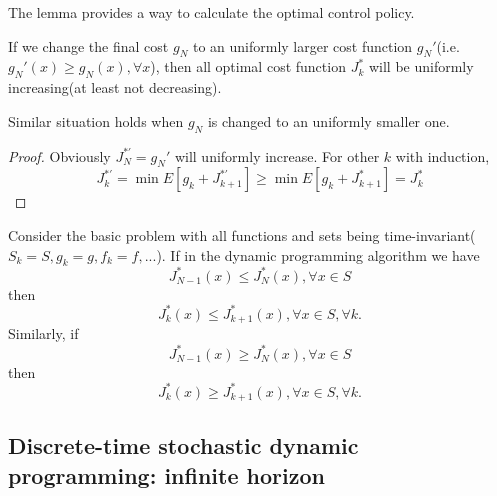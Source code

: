 \begin{refsection}
\begin{remark}[interpretation]
	The lemma provides a way to calculate the optimal control policy.
\end{remark}

\begin{lemma}
	If we change the final cost $g_N$ to an uniformly larger cost function $g_N'$(i.e. $g_N'(x) \geq g_N(x),\forall x$), then all optimal cost function $J_k^*$ will be uniformly increasing(at least not decreasing).
	
	Similar situation holds when $g_N$ is changed to an uniformly smaller one.
\end{lemma}
\begin{proof}
	Obviously $J_N^{*'} = g_N'$ will uniformly increase. For other $k$ with induction, 
	$$J_k^{*'} = \min E[g_k + J_{k+1}^{*'}] \geq \min E[g_k + J_{k+1}^*] = J^*_k$$
\end{proof}

\begin{lemma}\cite[60]{bertsekas2012dynamic}
	Consider the basic problem with all functions and sets being time-invariant($S_k=S,g_k=g,f_k = f,...$).
	If in the dynamic programming algorithm we have 
	$$J_{N-1}^*(x) \leq J_N^*(x),\forall x\in S$$
	then
	$$J_{k}^*(x) \leq J_{k+1}^*(x), \forall x\in S, \forall k.$$
	Similarly, if 
	$$J_{N-1}^*(x) \geq J_N^*(x),\forall x\in S$$
	then
	$$J_{k}^*(x) \geq J_{k+1}^*(x), \forall x\in S, \forall k.$$
\end{lemma}

\subsection{Discrete-time stochastic dynamic programming: infinite horizon}

\end{refsection}
